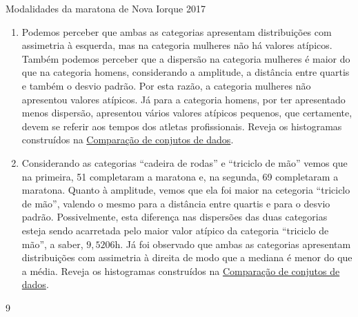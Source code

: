 {\begin{answer}{Modalidades da maratona de Nova Iorque 2017}
{\begin{enumerate}
Logo, conclui-se que nestas categorias tem-se assimetria à direita acentuada. Observe, que nestes dois casos tem-se que a mediana é menor do que a média. Reveja os histogramas construídos na ativ-comparacao-de-diferentes-grupos.

Considerando as categorias “homens”{} e “mulheres”, vemos que

\begin{align*}
Q_1-\text{Min}&>>\text{Max}-Q_3;\\
\text{Mediana}-Q_1&>Q_3-\text{Mediana e}\\ 
\text{Mediana}-\text{Min}&>>\text{Max}-\text{mediana},\\
\end{align*}
em que o símbolo $>>$ é usado para indicar “bem maior do que”. Logo, conclui-se que nestas categorias tem-se assimetria à esquerda acentuada. Observe, que nestes dois casos tem-se que a mediana é maior do que a média. Reveja os histogramas construídos na atividade \hyperref[\detokenize{PE104-5:ativ-compara-categorias}]{Comparação de conjutos de dados}.

\item Podemos perceber que ambas as categorias apresentam distribuições com assimetria à esquerda, mas na categoria mulheres não há valores atípicos. Também podemos perceber que a dispersão na categoria mulheres é maior do que na categoria homens, considerando a amplitude, a distância entre quartis e também o desvio padrão. Por esta razão, a categoria mulheres não apresentou valores atípicos. Já para a categoria homens, por ter apresentado menos dispersão, apresentou vários valores atípicos pequenos, que certamente, devem se referir aos tempos dos atletas profissionais. Reveja os histogramas construídos na \hyperref[\detokenize{PE104-5:ativ-compara-categorias}]{Comparação de conjutos de dados}.

\item Considerando as categorias “cadeira de rodas”{} e “triciclo de mão”{} vemos que na primeira, 51 completaram a maratona e, na segunda, 69 completaram a maratona. Quanto à amplitude, vemos que ela foi maior na cetegoria “triciclo de mão”, valendo o mesmo para a distância entre quartis e para o desvio padrão. Possivelmente, esta diferença nas dispersões das duas categorias esteja sendo acarretada pelo maior valor atípico da categoria “triciclo de mão”, a saber, $9{,}5206$h. Já foi observado que ambas as categorias apresentam distribuições com assimetria à direita de modo que a mediana é menor do que a média. Reveja os histogramas construídos na \hyperref[\detokenize{PE104-5:ativ-compara-categorias}]{Comparação de conjutos de dados}.
\end{enumerate}
}{9}
\end{answer}

}
